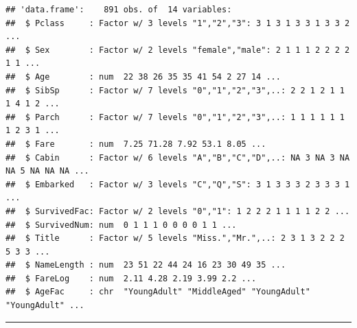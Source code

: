 \documentclass[]{article}
\newenvironment{Shaded}{\begin{snugshade}}{\end{snugshade}}
\newcommand{\KeywordTok}[1]{\textcolor[rgb]{0.13,0.29,0.53}{\textbf{#1}}}
\newcommand{\DecValTok}[1]{\textcolor[rgb]{0.00,0.00,0.81}{#1}}
\newcommand{\StringTok}[1]{\textcolor[rgb]{0.31,0.60,0.02}{#1}}
\newcommand{\OperatorTok}[1]{\textcolor[rgb]{0.81,0.36,0.00}{\textbf{#1}}}
\newcommand{\NormalTok}[1]{#1}
\begin{document}
\begin{Shaded}
\end{Shaded}

\begin{verbatim}
## 'data.frame':    891 obs. of  14 variables:
##  $ Pclass     : Factor w/ 3 levels "1","2","3": 3 1 3 1 3 3 1 3 3 2 ...
##  $ Sex        : Factor w/ 2 levels "female","male": 2 1 1 1 2 2 2 2 1 1 ...
##  $ Age        : num  22 38 26 35 35 41 54 2 27 14 ...
##  $ SibSp      : Factor w/ 7 levels "0","1","2","3",..: 2 2 1 2 1 1 1 4 1 2 ...
##  $ Parch      : Factor w/ 7 levels "0","1","2","3",..: 1 1 1 1 1 1 1 2 3 1 ...
##  $ Fare       : num  7.25 71.28 7.92 53.1 8.05 ...
##  $ Cabin      : Factor w/ 6 levels "A","B","C","D",..: NA 3 NA 3 NA NA 5 NA NA NA ...
##  $ Embarked   : Factor w/ 3 levels "C","Q","S": 3 1 3 3 3 2 3 3 3 1 ...
##  $ SurvivedFac: Factor w/ 2 levels "0","1": 1 2 2 2 1 1 1 1 2 2 ...
##  $ SurvivedNum: num  0 1 1 1 0 0 0 0 1 1 ...
##  $ Title      : Factor w/ 5 levels "Miss.","Mr.",..: 2 3 1 3 2 2 2 5 3 3 ...
##  $ NameLength : num  23 51 22 44 24 16 23 30 49 35 ...
##  $ FareLog    : num  2.11 4.28 2.19 3.99 2.2 ...
##  $ AgeFac     : chr  "YoungAdult" "MiddleAged" "YoungAdult" "YoungAdult" ...
\end{verbatim}

\begin{center}\rule{0.5\linewidth}{\linethickness}\end{center}
\end{document}
